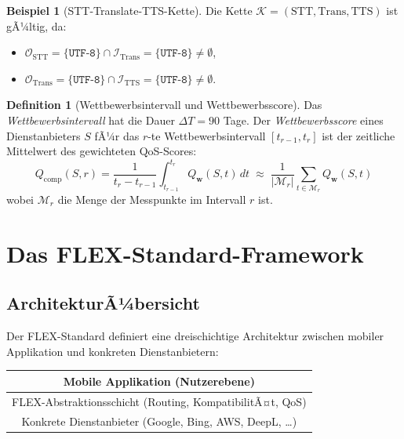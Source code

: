 ﻿\documentclass[a4paper,12pt]{article}
\theoremstyle{definition}
\newtheorem{definition}{Definition}
\newtheorem{beispiel}{Beispiel}
\begin{document}
\begin{beispiel}[STT-Translate-TTS-Kette]
Die Kette $\mathcal{K} = (\mathrm{STT}, \mathrm{Trans}, \mathrm{TTS})$ ist gÃ¼ltig, da:
\begin{itemize}
    \item $\mathcal{O}_\mathrm{STT} = \{\texttt{UTF-8}\} \cap \mathcal{I}_\mathrm{Trans} = \{\texttt{UTF-8}\} \neq \emptyset$,
    \item $\mathcal{O}_\mathrm{Trans} = \{\texttt{UTF-8}\} \cap \mathcal{I}_\mathrm{TTS} = \{\texttt{UTF-8}\} \neq \emptyset$.
\end{itemize}
\end{beispiel}

\begin{definition}[Wettbewerbsintervall und Wettbewerbsscore]
\label{def:wettbewerb}
Das \emph{Wettbewerbsintervall} hat die Dauer $\Delta T = 90$ Tage. Der \emph{Wettbewerbsscore} eines Dienstanbieters $S$ fÃ¼r das $r$-te Wettbewerbsintervall $[t_{r-1}, t_r]$ ist der zeitliche Mittelwert des gewichteten QoS-Scores:
\[
    Q_{\mathrm{comp}}(S, r) = \frac{1}{t_r - t_{r-1}} \int_{t_{r-1}}^{t_r} Q_{\mathbf{w}}(S, t)\, dt
    \;\approx\; \frac{1}{|\mathcal{M}_r|} \sum_{t \in \mathcal{M}_r} Q_{\mathbf{w}}(S, t)
\]
wobei $\mathcal{M}_r$ die Menge der Messpunkte im Intervall $r$ ist.
\end{definition}

\section{Das FLEX-Standard-Framework}
\label{sec:flex}

\subsection{ArchitekturÃ¼bersicht}

Der FLEX-Standard definiert eine dreischichtige Architektur zwischen mobiler Applikation und konkreten Dienstanbietern:

\begin{center}
\begin{tabular}{|c|}
\hline
\rule{0pt}{2.2ex}\textbf{Mobile Applikation (Nutzerebene)}\\
\hline
\rule{0pt}{2.2ex}FLEX-Abstraktionsschicht (Routing, KompatibilitÃ¤t, QoS)\\
\hline
\rule{0pt}{2.2ex}Konkrete Dienstanbieter (Google, Bing, AWS, DeepL, \ldots)\\
\hline
\end{tabular}
\end{center}
\end{document}
